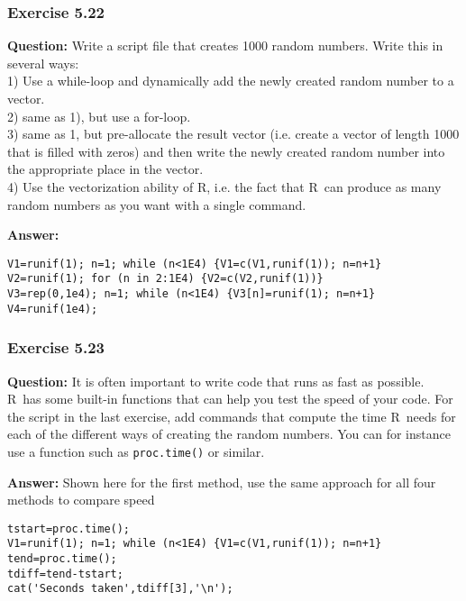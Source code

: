 \documentclass [11pt]{article}
\newcommand{\code}[1]{{\tt #1}}
\newcommand\R{{\sf R}}
\begin{document}
\subsubsection*{Exercise 5.22}
\textbf{Question:} Write a script file that creates 1000 random numbers. Write this in several ways: \\
1) Use a while-loop and dynamically add the newly created random number to a vector.\\
2) same as 1), but use a for-loop. \\
3) same as 1, but pre-allocate the result vector (i.e. create a vector of length 1000 that is filled with zeros) and then write the newly created random number into the appropriate place in the vector. \\
4) Use the vectorization ability of \R, i.e. the fact that \R\ can produce as many random numbers as you want with a single command.


\textbf{Answer:}\\
\begin{verbatim}
V1=runif(1); n=1; while (n<1E4) {V1=c(V1,runif(1)); n=n+1} 
V2=runif(1); for (n in 2:1E4) {V2=c(V2,runif(1))} 
V3=rep(0,1e4); n=1; while (n<1E4) {V3[n]=runif(1); n=n+1} 
V4=runif(1e4);
\end{verbatim}

\subsubsection*{Exercise 5.23}
\textbf{Question:} It is often important to write code that runs as fast as possible. \R\ has some built-in functions that can help you test the speed of your code. For the script in the last exercise, add commands that compute the time \R\ needs for each of the different ways of creating the random numbers. You can for instance use a function such as \code{proc.time()} or similar.


\textbf{Answer:} Shown here for the first method, use the same approach for all four methods to compare speed
\begin{verbatim}
tstart=proc.time();
V1=runif(1); n=1; while (n<1E4) {V1=c(V1,runif(1)); n=n+1} 
tend=proc.time();
tdiff=tend-tstart;
cat('Seconds taken',tdiff[3],'\n');
\end{verbatim}
\end{document}

